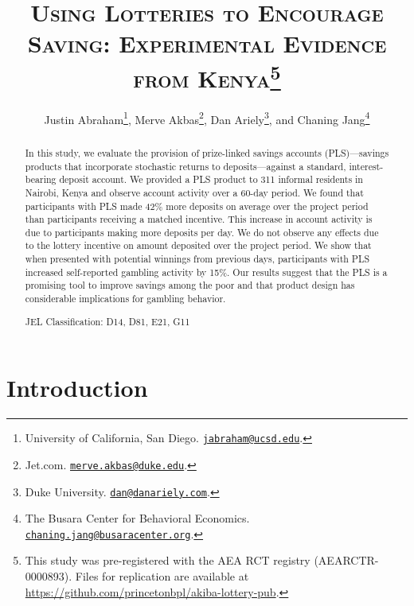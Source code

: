 \documentclass[11pt]{article}
\begin{document}
\title{\textsc{Using Lotteries to Encourage Saving: Experimental Evidence from Kenya}\protect\footnote{This study was pre-registered with the AEA RCT registry (AEARCTR-0000893). Files for replication are available at \url{https://github.com/princetonbpl/akiba-lottery-pub}.}}

	\author{Justin Abraham\thanks{University of California, San Diego. \protect\href{mailto:jabraham@ucsd.edu}{\nolinkurl{jabraham@ucsd.edu}}.}, Merve Akbas\thanks{Jet.com. \protect\href{mailto:merve.akbas@duke.edu}{\nolinkurl{merve.akbas@duke.edu}}.}, Dan Ariely\thanks{Duke University. \protect\href{mailto:dan@danariely.com}{\nolinkurl{dan@danariely.com}}.}, and Chaning Jang\thanks{The Busara Center for Behavioral Economics. \protect\href{mailto:chaning.jang@busaracenter.org}{\nolinkurl{chaning.jang@busaracenter.org}}.}} %

	\maketitle

	\begin{abstract}

		In this study, we evaluate the provision of prize-linked savings accounts (PLS)---savings products that incorporate stochastic returns to deposits---against a standard, interest-bearing deposit account. We provided a PLS product to 311 informal residents in Nairobi, Kenya and observe account activity over a 60-day period. We found that participants with PLS made 42\% more deposits on average over the project period than participants receiving a matched incentive. This increase in account activity is due to participants making more deposits per day. We do not observe any effects due to the lottery incentive on amount deposited over the project period. We show that when presented with potential winnings from previous days, participants with PLS increased self-reported gambling activity by 15\%. Our results suggest that the PLS is a promising tool to improve savings among the poor and that product design has considerable implications for gambling behavior.

		JEL Classification: D14, D81, E21, G11

	\end{abstract}

\newpage

\section{Introduction}
\end{document}
